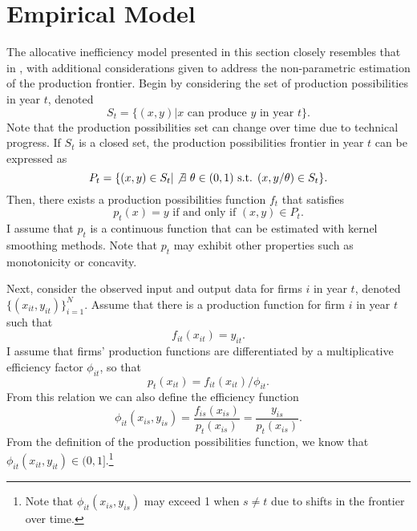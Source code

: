\documentclass[twocolumn]{article}
\begin{document}
\section{Empirical Model}

The allocative inefficiency model presented in this section closely resembles that in \cite{LovellSchmidt}, with additional considerations given to address the non-parametric estimation of the production frontier. Begin by considering the set of production possibilities in year $t$, denoted
\begin{equation}
	S_t = \{(x, y)|x\mbox{ can produce }y\mbox{ in year }t\}.
\end{equation}
Note that the production possibilities set can change over time due to technical progress. If $S_t$ is a closed set, the production possibilities frontier in year $t$ can be expressed as
\begin{equation}
	P_t = \{(x, y)\in S_t|\not\exists\mbox{ } \theta\in(0, 1)\mbox{ s.t. } (x, y/\theta)\in S_t\}.
\end{equation}
Then, there exists a production possibilities function $f_t$ that satisfies
\begin{equation}
	p_t(x) = y \mbox{ if and only if } (x, y)\in P_t.
\end{equation}
I assume that $p_t$ is a continuous function that can be estimated with kernel smoothing methods. Note that $p_t$ may exhibit other properties such as monotonicity or concavity.

Next, consider the observed input and output data for firms $i$ in year $t$, denoted $\{(x_{it}, y_{it})\}_{i=1}^N$. Assume that there is a production function for firm $i$ in year $t$ such that
\begin{equation}
	f_{it}(x_{it}) = y_{it}.
\end{equation}
I assume that firms' production functions are differentiated by a multiplicative efficiency factor $\phi_{it}$, so that
\begin{equation}
	\label{eqn:possprod}
	p_t(x_{it}) = f_{it}(x_{it}) / \phi_{it}.
\end{equation}
From this relation we can also define the efficiency function
\begin{equation}
	\phi_{it}(x_{is}, y_{is}) = \frac{f_{is}(x_{is})}{p_t(x_{is})} = \frac{y_{is}}{p_t(x_{is})}.
\end{equation}
From the definition of the production possibilities function, we know that $\phi_{it}(x_{it}, y_{it})\in(0, 1]$.\footnote{Note that $\phi_{it}(x_{is}, y_{is})$ may exceed 1 when $s\neq t$ due to shifts in the frontier over time.}
\end{document}

